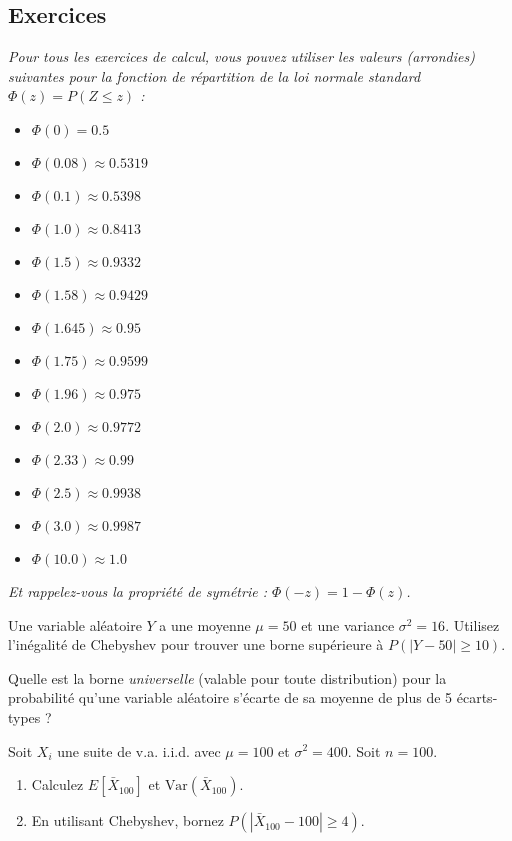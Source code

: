 \subsection{Exercices}

\textit{Pour tous les exercices de calcul, vous pouvez utiliser les valeurs (arrondies) suivantes pour la fonction de répartition de la loi normale standard $\Phi(z) = P(Z \le z)$ :}
\begin{itemize}
    \item $\Phi(0) = 0.5$
    \item $\Phi(0.08) \approx 0.5319$
    \item $\Phi(0.1) \approx 0.5398$
    \item $\Phi(1.0) \approx 0.8413$
    \item $\Phi(1.5) \approx 0.9332$
    \item $\Phi(1.58) \approx 0.9429$
    \item $\Phi(1.645) \approx 0.95$
    \item $\Phi(1.75) \approx 0.9599$
    \item $\Phi(1.96) \approx 0.975$
    \item $\Phi(2.0) \approx 0.9772$
    \item $\Phi(2.33) \approx 0.99$
    \item $\Phi(2.5) \approx 0.9938$
    \item $\Phi(3.0) \approx 0.9987$
    \item $\Phi(10.0) \approx 1.0$
\end{itemize}
\textit{Et rappelez-vous la propriété de symétrie : $\Phi(-z) = 1 - \Phi(z)$.}


\begin{exercicebox}
Une variable aléatoire $Y$ a une moyenne $\mu=50$ et une variance $\sigma^2=16$.
Utilisez l'inégalité de Chebyshev pour trouver une borne supérieure à $P(|Y - 50| \ge 10)$.
\end{exercicebox}

\begin{exercicebox}
Quelle est la borne \textit{universelle} (valable pour toute distribution) pour la probabilité qu'une variable aléatoire s'écarte de sa moyenne de plus de 5 écarts-types ?
\end{exercicebox}

\begin{exercicebox}
Soit $X_i$ une suite de v.a. i.i.d. avec $\mu=100$ et $\sigma^2=400$. Soit $n=100$.
\begin{enumerate}
    \item Calculez $E[\bar{X}_{100}]$ et $\text{Var}(\bar{X}_{100})$.
    \item En utilisant Chebyshev, bornez $P(|\bar{X}_{100} - 100| \ge 4)$.
\end{enumerate}
\end{exercicebox}


